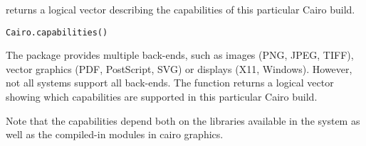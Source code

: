 \begin{Description}\relax
{} returns a logical vector describing the
capabilities of this particular Cairo build.
\end{Description}
\begin{Usage}
\begin{verbatim}
Cairo.capabilities()
\end{verbatim}
\end{Usage}
\begin{Details}\relax
The  package provides multiple back-ends, such as images
(PNG, JPEG, TIFF), vector graphics (PDF, PostScript, SVG) or displays
(X11, Windows). However, not all systems support all back-ends. The
 function returns a logical vector showing
which capabilities are supported in this particular Cairo build.

Note that the capabilities depend both on the libraries available in
the system as well as the compiled-in modules in cairo graphics.
\end{Details}
\begin{SeeAlso}\relax
{}
\end{SeeAlso}

